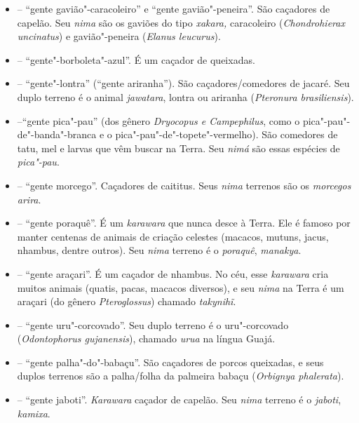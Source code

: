 \begin{itemize}
  Terra é o gavião \emph{kapitỹ}, gavião"-de"-cauda"-curta (\emph{Buteo
  brachyurus}).
\item
  \emph{} -- ``gente gavião"-caracoleiro'' e ``gente
  gavião"-peneira''. São caçadores de capelão. Seu \emph{nima} são os
  gaviões do tipo \emph{xakara,} caracoleiro (\emph{Chondrohierax
  uncinatus}) e gavião"-peneira (\emph{Elanus leucurus}).
\item
  \emph{} -- ``gente"-borboleta"-azul''. É um caçador de
  queixadas.
\item
  \emph{} -- ``gente"-lontra'' (``gente ariranha'').
  São caçadores/comedores de jacaré. Seu duplo terreno é o animal
  \emph{jawatara}, lontra ou ariranha (\emph{Pteronura brasiliensis}).
\item
  \emph{} --``gente pica"-pau'' (dos gênero
  \emph{Dryocopus e Campephilus}, como o pica"-pau"-de"-banda"-branca e o
  pica"-pau"-de"-topete"-vermelho). São comedores de tatu, mel e larvas que
  vêm buscar na Terra. Seu \emph{nimá} são essas espécies de
  \emph{pica"-pau}.
\item
   -- ``gente morcego''. Caçadores de
  caititus. Seus \emph{nima} terrenos são os \emph{morcegos}
  \emph{arira}.
\item
  \emph{} -- ``gente poraquê''. É um \emph{karawara}
  que nunca desce à Terra. Ele é famoso por manter centenas de animais
  de criação celestes (macacos, mutuns, jacus, nhambus, dentre outros).
  Seu \emph{nima} terreno é o \emph{poraquê}, \emph{manakya}.
\item
  \emph{} -- ``gente araçari''. É um caçador de
  nhambus. No céu, esse \emph{karawara} cria muitos animais (quatis,
  pacas, macacos diversos), e seu \emph{nima} na Terra é um araçari (do
  gênero \emph{Pteroglossus}) chamado \emph{takynihĩ}.
\item
  \emph{} -- ``gente uru"-corcovado''. Seu duplo terreno
  é o uru"-corcovado (\emph{Odontophorus gujanensis}), chamado
  \emph{urua} na língua Guajá.
\item
  \emph{} -- ``gente palha"-do"-babaçu''. São
  caçadores de porcos queixadas, e seus duplos terrenos são a
  palha/folha da palmeira babaçu (\emph{Orbignya phalerata}).
\item
   -- ``gente jaboti''. \emph{Karawara} caçador de capelão.
  Seu \emph{nima} terreno é o \emph{jaboti}, \emph{kamixa}.

\end{itemize}
